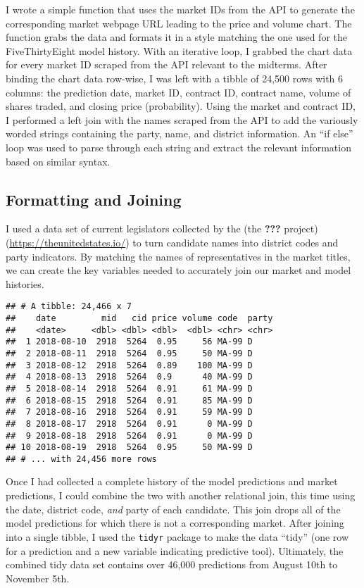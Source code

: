 \documentclass[]{article}
\begin{document}
I wrote a simple function that uses the market IDs from the API to
generate the corresponding market webpage URL leading to the price and
volume chart. The function grabs the data and formats it in a style
matching the one used for the FiveThirtyEight model history. With an
iterative loop, I grabbed the chart data for every market ID scraped
from the API relevant to the midterms. After binding the chart data
row-wise, I was left with a tibble of 24,500 rows with 6 columns: the
prediction date, market ID, contract ID, contract name, volume of shares
traded, and closing price (probability). Using the market and contract
ID, I performed a left join with the names scraped from the API to add
the variously worded strings containing the party, name, and district
information. An ``if else'' loop was used to parse through each string
and extract the relevant information based on similar syntax.

\subsection{Formatting and Joining}\label{formatting-and-joining}

I used a data set of current legislators collected by the (the
{\textbf{???}} project)(\url{https://theunitedstates.io/}) to turn
candidate names into district codes and party indicators. By matching
the names of representatives in the market titles, we can create the key
variables needed to accurately join our market and model histories.

\begin{verbatim}
## # A tibble: 24,466 x 7
##    date         mid   cid price volume code  party
##    <date>     <dbl> <dbl> <dbl>  <dbl> <chr> <chr>
##  1 2018-08-10  2918  5264  0.95     56 MA-99 D    
##  2 2018-08-11  2918  5264  0.95     50 MA-99 D    
##  3 2018-08-12  2918  5264  0.89    100 MA-99 D    
##  4 2018-08-13  2918  5264  0.9      40 MA-99 D    
##  5 2018-08-14  2918  5264  0.91     61 MA-99 D    
##  6 2018-08-15  2918  5264  0.91     85 MA-99 D    
##  7 2018-08-16  2918  5264  0.91     59 MA-99 D    
##  8 2018-08-17  2918  5264  0.91      0 MA-99 D    
##  9 2018-08-18  2918  5264  0.91      0 MA-99 D    
## 10 2018-08-19  2918  5264  0.95     50 MA-99 D    
## # ... with 24,456 more rows
\end{verbatim}

Once I had collected a complete history of the model predictions and
market predictions, I could combine the two with another relational
join, this time using the date, district code, \emph{and} party of each
candidate. This join drops all of the model predictions for which there
is not a corresponding market. After joining into a single tibble, I
used the \texttt{tidyr} package to make the data ``tidy'' (one row for a
prediction and a new variable indicating predictive tool). Ultimately,
the combined tidy data set contains over 46,000 predictions from August
10th to November 5th.
\end{document}
